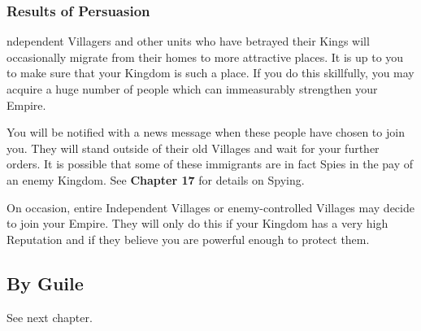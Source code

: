 \subsubsection{\textsf{Results of Persuasion}}

ndependent Villagers and other units who have betrayed their Kings will occasionally migrate from their homes to more attractive places. It is up to you to make sure that your Kingdom is such a place. If you do this skillfully, you may acquire a huge number of people which can immeasurably strengthen your Empire.


You will be notified with a news message when these people have chosen to join you. They will stand outside of their old Villages and wait for your further orders. It is possible that some of these immigrants are in fact Spies in the pay of an enemy Kingdom. See \textbf{Chapter 17} for details on Spying.


On occasion, entire Independent Villages or enemy-controlled Villages may decide to join your Empire. They will only do this if your Kingdom has a very high Reputation and if they believe you are powerful enough to protect them.

\subsection{\textsf{By Guile}}

See next chapter.